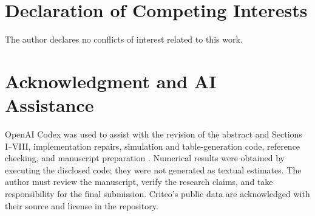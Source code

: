 \documentclass{ieeeaccess}
\begin{document}
\section*{Declaration of Competing Interests}
The author declares no conflicts of interest related to this work.

\section*{Acknowledgment and AI Assistance}
OpenAI Codex was used to assist with the revision of the abstract and Sections I--VIII, implementation repairs, simulation and table-generation code, reference checking, and manuscript preparation \cite{codex}. Numerical results were obtained by executing the disclosed code; they were not generated as textual estimates. The author must review the manuscript, verify the research claims, and take responsibility for the final submission. Criteo's public data are acknowledged with their source and license in the repository.
\end{document}

